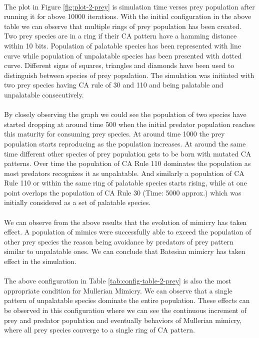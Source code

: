 \paragraph{}
The plot in Figure \ref{fig:plot-2-prey} is simulation time verses prey population after running it for above 10000 iterations. With the initial configuration in the above table we can observe that multiple rings of prey population has been created. Two prey species are in a ring if their CA pattern have a hamming distance within 10 bits. Population of palatable species has been represented with line curve while population of unpalatable species has been presented with dotted curve. Different signs of squares, triangles and diamonds have been used to distinguish between species of prey population. The simulation was initiated with two prey species having CA rule of 30 and 110 and being palatable and unpalatable consecutively.

\paragraph{}
By closely observing the graph we could see the population of two species have started dropping at around time 500 when the initial predator population reaches this maturity for consuming prey species. At around time 1000 the prey population starts reproducing as the population increases. At around the same time different other species of prey population gets to be born with mutated CA patterns. Over time the population of CA Rule 110 dominates the population as most predators recognizes it as unpalatable. And similarly a population of CA Rule 110 or within the same ring of palatable species starts rising, while at one point overlaps the population of CA Rule 30 (Time: 5000 approx.) which was initially considered as a set of palatable species.

\paragraph{}
We can observe from the above results that the evolution of mimicry has taken effect. A population of mimics were successfully able to exceed the population of other prey species the reason being avoidance by predators of prey pattern similar to unpalatable ones. We can conclude that Batesian mimicry has taken effect in the simulation.

\paragraph{}
The above configuration in Table \ref{tab:config-table-2-prey} is also the most appropriate condition for Mullerian Mimicry. We can observe that a single pattern of unpalatable species dominate the entire population. These effects can be observed in this configuration where we can see the continuous increment of prey and predator population and eventually behaviors of Mullerian mimicry, where all prey species converge to a single ring of CA pattern.

